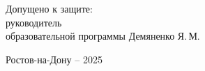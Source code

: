 \begin{singlespacing}
\begin{center}
        \vspace{15mm}

        \noindent
        \begin{flushleft}
            Допущено к защите:\\
            руководитель \\
            образовательной программы \underline{\hspace*{60mm}} Демяненко Я.\,М.
        \end{flushleft}




        \vfill
        Ростов-на-Дону -- 2025

    \end{center}

    \singlespacing
\end{singlespacing}